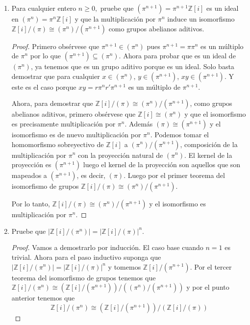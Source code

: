 \documentclass[letter,twoside,12pt]{article}
\begin{document}
\begin{enumerate}[label=\textbf{(\alph*)}]
\item Para cualquier entero $ n \geq 0, $ pruebe que $ (\pi^{n+1}) = \pi^{n+1}\mathbb{Z}[i]$ es un ideal en $ (\pi^n) = \pi^n\mathbb{Z}[i]$ y que la multiplicación por $ \pi^n $ induce un isomorfismo $ \mathbb{Z}[i]/(\pi) \cong (\pi^n)/(\pi^{n+1})$ como grupos abelianos aditivos.

\begin{proof}
Primero obsérvese que $ \pi^{n+1} \in (\pi^n) $ pues $\pi^{n+1}= \pi\pi^n$ es un múltiplo de $ \pi^{n} $ por lo que $ (\pi^{n+1}) \subseteq (\pi^n) $. Ahora para probar que es un ideal de $(\pi^n)$, ya tenemos que es un grupo aditivo porque es un ideal. Solo basta demostrar que para cualquier $x \in (\pi^{n})$, $y \in (\pi^{n+1})$, $xy \in (\pi^{n+1})$. Y este es el caso porque $ xy = r\pi^{n}r'\pi^{n+1}$ es un múltiplo de $ \pi^{n+1} $.

Ahora, para demostrar que $ \mathbb{Z}[i]/(\pi) \cong (\pi^n)/(\pi^{n+1})$, como grupos abelianos aditivos, primero obsérvese que $ \mathbb{Z}[i] \cong (\pi^n) $ y que el isomorfismo es precisamente multiplicación por $\pi^{n}$. Además $(\pi)\cong (\pi^{n+1})$ y el isomorfismo es de nuevo multiplicación por $ \pi^{n} $. Podemos tomar el homomorfismo sobreyectivo de $\mathbb{Z}[i]$ a $ (\pi^n)/(\pi^{n+1}) $, composición de la multiplicación por $ \pi^n $ con la proyección natural de $ (\pi^n) $. El kernel de la proyección es $(\pi^{n+1}) $ luego el kernel de la proyección son aquellos que son mapeados a $(\pi^{n+1}) $, es decir, $(\pi)$. Luego por el primer teorema del isomorfismo de grupos $ \mathbb{Z}[i]/(\pi) \cong (\pi^n)/(\pi^{n+1})$.

Por lo tanto, $ \mathbb{Z}[i]/(\pi) \cong (\pi^n)/(\pi^{n+1}) $ y el isomorfismo es multiplicación por $ \pi^{n} $. 
\end{proof}

\item Pruebe que $ |\mathbb{Z}[i]/(\pi^n)|=|\mathbb{Z}[i]/(\pi)|^n $.
\begin{proof}
Vamos a demostrarlo por inducción. El caso base cuando $ n = 1 $ es trivial. Ahora para el paso inductivo suponga que $ |\mathbb{Z}[i]/(\pi^n)|=|\mathbb{Z}[i]/(\pi)|^n $ y tomemos $\mathbb{Z}[i]/(\pi^{n+1})$. Por el tercer teorema del isomorfismo de grupos tenemos que $\mathbb{Z}[i]/(\pi^{n}) \cong (\mathbb{Z}[i]/(\pi^{n+1}))/((\pi^{n})/(\pi^{n+1}))$ y por el punto anterior tenemos que 
\begin{equation}
\mathbb{Z}[i]/(\pi^{n}) \cong (\mathbb{Z}[i]/(\pi^{n+1})) / (\mathbb{Z}[i]/(\pi)) \nonumber
\end{equation}


\end{proof}
\end{enumerate}
\end{document}
